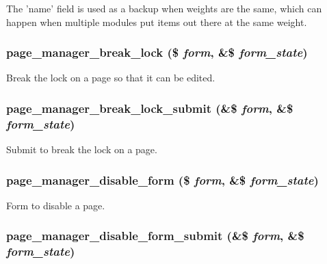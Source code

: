 The 'name' field is used as a backup when weights are the same, which can happen when multiple modules put items out there at the same weight. \hypertarget{page__manager_8admin_8inc_a84d9035a181a37f694cd057c0269b3d5}{
\subsubsection[{page\_\-manager\_\-break\_\-lock}]{\setlength{\rightskip}{0pt plus 5cm}page\_\-manager\_\-break\_\-lock (\$ {\em form}, \/  \&\$ {\em form\_\-state})}}
\label{page__manager_8admin_8inc_a84d9035a181a37f694cd057c0269b3d5}
Break the lock on a page so that it can be edited. \hypertarget{page__manager_8admin_8inc_a8c7f274f66fb82c088351d36b1ac67c9}{
\subsubsection[{page\_\-manager\_\-break\_\-lock\_\-submit}]{\setlength{\rightskip}{0pt plus 5cm}page\_\-manager\_\-break\_\-lock\_\-submit (\&\$ {\em form}, \/  \&\$ {\em form\_\-state})}}
\label{page__manager_8admin_8inc_a8c7f274f66fb82c088351d36b1ac67c9}
Submit to break the lock on a page. \hypertarget{page__manager_8admin_8inc_a957c3f3d897ca05673da82bc212b2a27}{
\subsubsection[{page\_\-manager\_\-disable\_\-form}]{\setlength{\rightskip}{0pt plus 5cm}page\_\-manager\_\-disable\_\-form (\$ {\em form}, \/  \&\$ {\em form\_\-state})}}
\label{page__manager_8admin_8inc_a957c3f3d897ca05673da82bc212b2a27}
Form to disable a page. \hypertarget{page__manager_8admin_8inc_a371e6b2f2287ca725b866c1f2c6312d6}{
\subsubsection[{page\_\-manager\_\-disable\_\-form\_\-submit}]{\setlength{\rightskip}{0pt plus 5cm}page\_\-manager\_\-disable\_\-form\_\-submit (\&\$ {\em form}, \/  \&\$ {\em form\_\-state})}}
